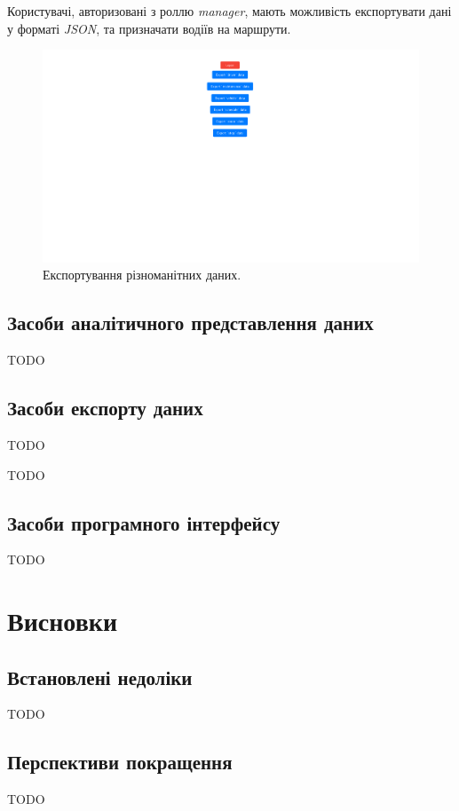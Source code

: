 \documentclass[oneside,14pt]{extarticle}
\begin{document}
Користувачі, авторизовані з роллю \textit{manager}, мають можливість експортувати дані у форматі \textit{JSON}, та призначати водіїв на маршрути.

\begin{figure}[H]
\centering
\includegraphics[scale=0.25]{5}
\caption{Експортування різноманітних даних.}
\end{figure}

\subsection{Засоби аналітичного представлення даних}
TODO

\subsection{Засоби експорту даних}
TODO

TODO

\subsection{Засоби програмного інтерфейсу}
TODO

\newpage

\section{Висновки}
\subsection{Встановлені недоліки}
TODO

\subsection{Перспективи покращення}
TODO
\end{document}
